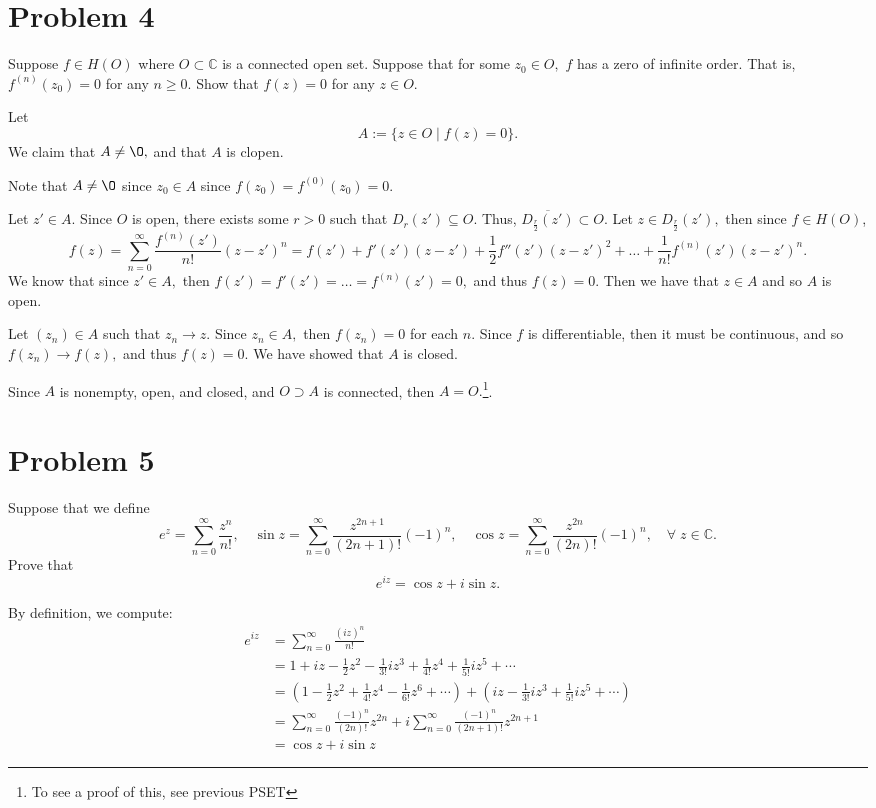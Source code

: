 \documentclass[11pt]{article}
\newcommand{\bbC}{\mathbb{C}}
\renewcommand{\emptyset}{\O}
\begin{document}
\newpage
\section*{Problem 4}
\begin{problem}
    Suppose $f \in H(O)$ where $O \subset \bbC$ is a connected open set. Suppose that for some $z_0 \in O,$ $f$ has a zero of infinite order. That is, $f^{(n)}(z_0) = 0$ for any $n\geq 0.$ Show that $f(z) = 0$ for any $z\in O.$
\end{problem}
\begin{solution}
Let 
\[A:= \{z \in O \mid f(z) = 0\}.\] We claim that $A \neq \emptyset,$ and that $A$ is clopen. 

Note that $A\neq \emptyset$ since $z_0 \in A$ since $f(z_0) = f^{(0)}(z_0) =0.$

Let $z'\in A.$ Since $O$ is open, there exists some $r>0$ such that $D_r(z')\subseteq O.$ Thus, $\overline{D_{\frac{r}{2}}(z')}\subset O.$ Let $z\in D_{\frac{r}{2}}(z'),$ then since $f\in H(O)$, 
\[f(z) = \sum_{n=0}^\infty \frac{f^{(n)}(z')}{n!}(z - z')^n = f(z') + f'(z')(z - z') + \frac{1}{2}f''(z')(z-z')^2 + \dots + \frac{1}{n!}f^{(n)}(z')(z - z')^n.\]
We know that since $z' \in A,$ then $f(z') = f'(z') = \dots = f^{(n)}(z') = 0,$ and thus $f(z) = 0.$ Then we have that $z \in A$ and so $A$ is open. 

Let $(z_n) \in A$ such that $z_n \to z.$ Since $z_n \in A,$ then $f(z_n) = 0$ for each $n.$ Since $f$ is differentiable, then it must be continuous, and so $f(z_n) \to f(z),$ and thus $f(z) = 0.$ We have showed that $A$ is closed.

Since $A$ is nonempty, open, and closed, and $O\supset A$ is connected, then $A = O.$\footnote{To see a proof of this, see previous PSET}. 
\end{solution}

\newpage
\section*{Problem 5}
\begin{problem}
    Suppose that we define 
    \[e^{z} = \sum_{n=0}^\infty \frac{z^n}{n!}, \quad \sin z = \sum_{n=0}^\infty \frac{z^{2n +1}}{(2n+1)!}(-1)^n, \quad \cos z = \sum_{n=0}^\infty \frac{z^{2n}}{(2n)!}(-1)^n, \quad \forall \; z\in \bbC.\] Prove that 
    \[e^{iz} = \cos z + i\sin z.\]
\end{problem}
\begin{solution}
 By definition, we compute:
 \begin{align*}
 e^{iz} &= \sum_{n=0}^\infty \frac{(iz)^n}{n!}\\
 &= 1 + iz - \frac{1}{2} z^2 - \frac{1}{3!}iz^3 + \frac{1}{4!}z^4 + \frac{1}{5!} iz^5 + \cdots\\
 &= (1 - \frac{1}{2}z^2 + \frac{1}{4!}z^4 - \frac{1}{6!}z^6 + \cdots) + (iz - \frac{1}{3!}iz^3 + \frac{1}{5!}iz^5+ \cdots)\\
 &= \sum_{n=0}^\infty \frac{(-1)^{n}}{(2n)!}z^{2n}  + i\sum_{n=0}^\infty \frac{(-1)^{n}}{(2n+1)!}z^{2n+1}\\
 &= \cos z + i\sin z
 \end{align*}
 
\end{solution}
\newpage
\end{document}
